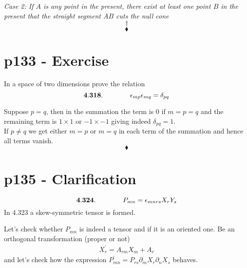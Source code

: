\textit{Case 2: If $A$ is any point in the present, there exist at least one point $B$ in the present that the straight segment $AB$ cuts the null cone}\\


$$\dagger$$
$$\blacklozenge$$
\newpage

\section{p133 - Exercise}
\begin{tcolorbox}
In a space of two dimensions prove the relation
$$\mathbf{4.318.}\quad\quad\quad\quad \epsilon_{mp}\epsilon_{mq} = \delta_{pq}$$
\end{tcolorbox}
Suppose $p=q$, then in the summation the term is $0$ if $m=p=q$ and the remaining term is $1\times 1$ or $-1\times -1$ giving indeed $\delta_{pq}=1$.\\ 
If  $p\neq q$ we get either $m=p$ or $m=q$ in each term of the summation and hence all terms vanish.
$$\blacklozenge$$
\newpage

\section{p135 - Clarification}
\begin{tcolorbox}
$$\mathbf{4.324.}\quad\quad\quad\quad P_{mn}= \epsilon_{mnrs}X_rY_s$$
In 4.323 a skew-symmetric tensor is formed.
\end{tcolorbox}
Let's check whether $P_{mn}$ is indeed a tensor and if it is an oriented one.
Be an orthogonal transformation (proper or not)
\begin{align}
X^{'}_r = A_{rm}X_m+A_r
\end{align}
and let's check how the expression $P^{'}_{mn}= P_{rs}\partial_m X_r \partial_n X_s$ behaves.

